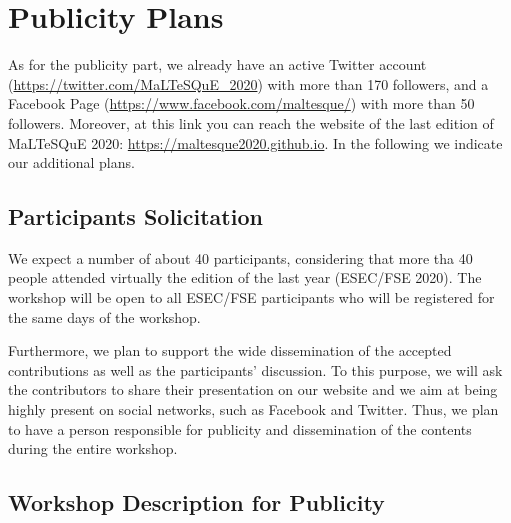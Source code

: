 
\section{Publicity Plans}

As for the publicity part, we already have an active Twitter account (\url{https://twitter.com/MaLTeSQuE_2020}) with more than 170 followers, and a Facebook Page (\url{https://www.facebook.com/maltesque/}) with more than 50 followers.
Moreover, at this link you can reach the website of the last edition of MaLTeSQuE 2020: \url{https://maltesque2020.github.io}.
In the following we indicate our additional plans.

\subsection{Participants Solicitation}

We expect a number of about 40 participants, considering that more tha 40 people attended virtually the edition of the last year (ESEC/FSE 2020).
The workshop will be open to all ESEC/FSE participants who will be registered for the same days of the workshop.

Furthermore, we plan to support the wide dissemination of the accepted contributions as well as the participants' discussion.
To this purpose, we will ask the contributors to share their presentation on our website and we aim at being highly present on social networks, such as Facebook and Twitter.
Thus, we plan to have a person responsible for publicity and dissemination of the contents during the entire workshop.

\subsection{Workshop Description for Publicity}

